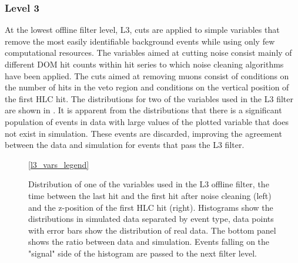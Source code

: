 \subsubsection{Level 3}
At the lowest offline filter level, L3, cuts are applied to simple variables that remove the most easily identifiable background events while using only few computational resources. The variables aimed at cutting noise consist mainly of different DOM hit counts within hit series to which noise cleaning algorithms have been applied. The cuts aimed at removing muons consist of conditions on the number of hits in the veto region and conditions on the vertical position of the first HLC hit. The distributions for two of the variables used in the L3 filter are shown in . It is apparent from the distributions that there is a significant population of events in data with large values of the plotted variable that does not exist in simulation. These events are discarded, improving the agreement between the data and simulation for events that pass the L3 filter.
%     
%     

\begin{figure}
    \centering
    \ref{l3_vars_legend}\par
    
    

    \caption{Distribution of one of the variables used in the L3 offline filter, the time between the last hit and the first hit after noise cleaning (left) and the z-position of the first HLC hit (right). Histograms show the distributions in simulated data separated by event type, data points with error bars show the distribution of real data. The bottom panel shows the ratio between data and simulation. Events falling on the "signal" side of the histogram are passed to the next filter level.}
    \label{fig:l3-cut-vars}
\end{figure}

